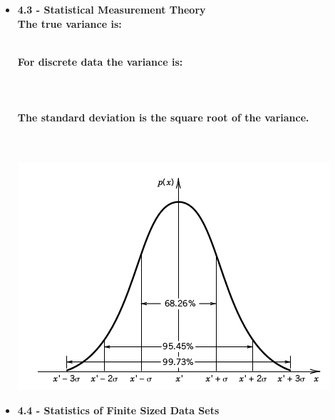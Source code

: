 \documentclass[11pt]{article}
\newcommand{\B}{\color{blue}}
\newcommand{\PR}{\color{mypurple}}
\begin{document}
\begin{itemize}
\begin{itemize}
\end{itemize}

		
		\newpage
		\item \textbf{ \LARGE 4.3 -  Statistical Measurement Theory  } \\
		
		\textbf{ \Large The true variance is:}\vspace{2mm}\\
		 \\
		\begin{framed}
		\textbf{ \Large For discrete data the {\bf \B variance} is:}\\\\
		\\\\
		\textbf{\Large The {\bf \PR standard deviation} is the square root of the {\bf \B variance}.}\\\\
		\vspace{0mm}\\
		\end{framed}
		
		\includegraphics[scale=1.2]{lecture1_fig4.png}
		
		\newpage
		\item \textbf{ \LARGE 4.4 -  Statistics of Finite Sized Data Sets  } \\\\




\begin{itemize}


\end{itemize}
\end{itemize}
\end{document}
